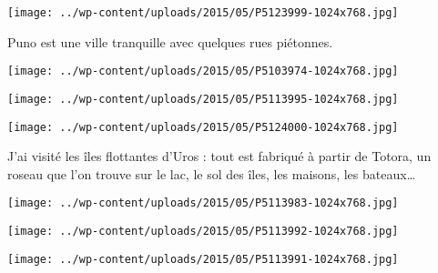  \newline
\centerline{\texttt{[image: ../wp-content/uploads/2015/05/P5123999-1024x768.jpg]} } 
 \newline
 Puno est une ville tranquille avec quelques rues piétonnes. \newline
 \newline
\centerline{\texttt{[image: ../wp-content/uploads/2015/05/P5103974-1024x768.jpg]} } 
 \newline
 \newline
\centerline{\texttt{[image: ../wp-content/uploads/2015/05/P5113995-1024x768.jpg]} } 
 \newline
 \newline
\centerline{\texttt{[image: ../wp-content/uploads/2015/05/P5124000-1024x768.jpg]} } 
 \newline
 J'ai visité les îles flottantes d'Uros : tout est fabriqué à partir de Totora, un roseau que l'on trouve sur le lac, le sol des îles, les maisons, les bateaux… \newline
 \newline
\centerline{\texttt{[image: ../wp-content/uploads/2015/05/P5113983-1024x768.jpg]} } 
 \newline
 \newline
\centerline{\texttt{[image: ../wp-content/uploads/2015/05/P5113992-1024x768.jpg]} } 
 \newline
 \newline
\centerline{\texttt{[image: ../wp-content/uploads/2015/05/P5113991-1024x768.jpg]} } 
 \newline

\newpage
 
